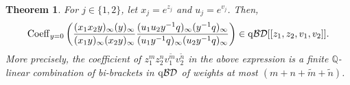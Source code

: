 \documentclass[12pt, reqno]{amsart}
\newtheorem{theorem}{Theorem}[section]
\theoremstyle{definition}
\theoremstyle{remark}
\numberwithin{equation}{section}
\newcommand{\Coe}{ {\rm Coeff} }
\newcommand{\Q}{ \mathbb Q }
\newcommand{\qBD}{{\rm q}{\mathcal {BD}}}
\newcommand{\w}{\tilde}
\numberwithin{equation}{section}
\begin{document}
\begin{theorem}  \label{t2t1yq} 
For $j \in \{1, 2\}$, let $x_j = e^{z_j}$ and $u_j = e^{v_j}$. Then,
\begin{eqnarray}    \label{t2t1yq.0}
\Coe_{y=0} \left (\frac{(x_1x_2y)_\infty (y)_\infty}
     {(x_1y)_\infty (x_2y)_\infty} 
\frac{(u_1u_2y^{-1}q)_\infty (y^{-1}q)_\infty}
     {(u_1y^{-1}q)_\infty (u_2y^{-1}q)_\infty} \right )
\in \qBD[[z_1,z_2,v_1,v_2]].
\end{eqnarray}
More precisely, the coefficient of $z_1^m z_2^n v_1^{\w m} v_2^{\w n}$ 
in the above expression is a finite $\Q$-linear combination of 
bi-brackets in $\qBD$ of weights at most $(m + n + \w m + \w n)$.
\end{theorem}
\end{document}
